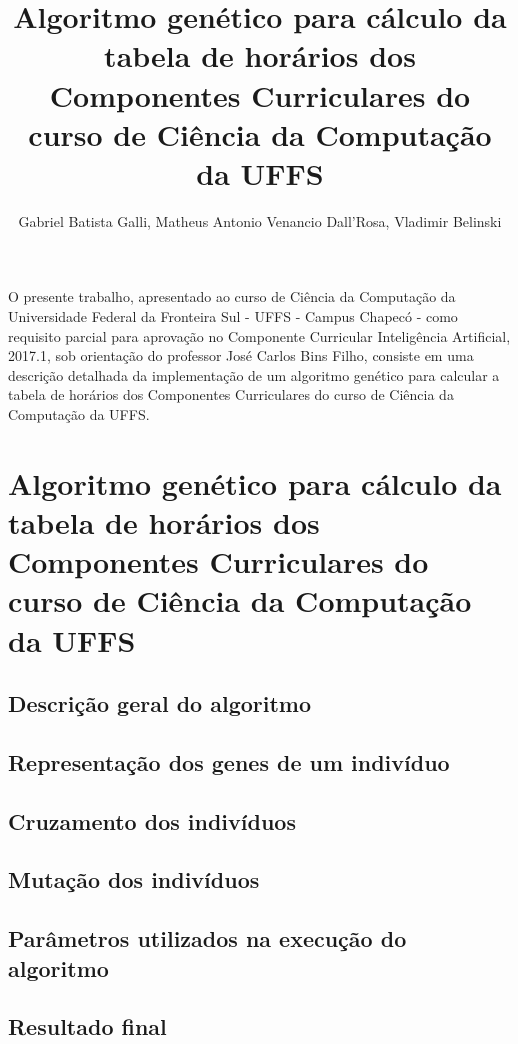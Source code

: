 \documentclass[12pt]{article}
\title{Algoritmo genético para cálculo da tabela de horários dos Componentes Curriculares do curso de Ciência da Computação da UFFS}
\author{Gabriel Batista Galli\inst{1}, Matheus Antonio Venancio Dall'Rosa\inst{1}, Vladimir Belinski\inst{1}}
\begin{document}
 

\maketitle
     
\begin{resumo} 
  O presente trabalho, apresentado ao curso de Ciência da Computação da Universidade Federal da Fronteira Sul - UFFS - Campus Chapecó - como requisito parcial para aprovação no Componente Curricular Inteligência Artificial, 2017.1, sob orientação do professor José Carlos Bins Filho, consiste em uma descrição detalhada da implementação de um algoritmo genético para calcular a tabela de horários dos Componentes Curriculares do curso de Ciência da Computação da UFFS.
\end{resumo}


\section{Algoritmo genético para cálculo da tabela de horários dos Componentes Curriculares do curso de Ciência da Computação da UFFS}

\subsection{Descrição geral do algoritmo}
\subsection{Representação dos genes de um indivíduo}
\subsection{Cruzamento dos indivíduos}
\subsection{Mutação dos indivíduos}
\subsection{Parâmetros utilizados na execução do algoritmo}
\subsection{Resultado final}
 

% 
% 
\end{document}
